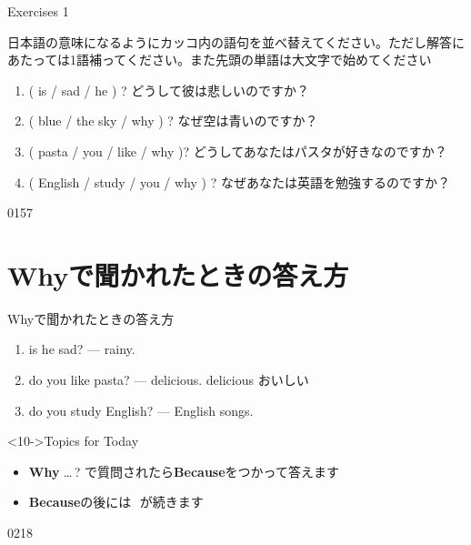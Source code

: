 \documentclass[aspectratio=169,xcolor={dvipsnames,table}]{beamer}
\begin{document}
\begin{frame}[plain]{Exercises 1}

{\small 日本語の意味になるようにカッコ内の語句を並べ替えてください。ただし解答にあたっては1語補ってください。また先頭の単語は大文字で始めてください}
 \begin{enumerate}
  \item ( is / sad / he ) ? どうして彼は悲しいのですか？\\
  \item ( blue / the sky / why ) ? なぜ空は青いのですか？\\
  \item ( pasta / you / like / why )? どうしてあなたはパスタが好きなのですか？\\
  \item ( English / study / you / why ) ? なぜあなたは英語を勉強するのですか？\\
 \end{enumerate}

\hfill{\tiny 0157}\,{\scriptsize {}}
\end{frame}
\section{Whyで聞かれたときの答え方}
\begin{frame}[plain]{Whyで聞かれたときの答え方}
 \begin{enumerate}
  \item<1->  is he sad? ---   rainy.
  \item<4->  do you like pasta? ---   delicious.%
\hfill{\scriptsize delicious  おいしい}
  \item<7->  do you study English? ---   English songs.
 \end{enumerate}

\bigskip

\begin{block}<10->{Topics for Today}
\pause
\begin{itemize}[square]\small
 \item {\bfseries Why} \ldots\,?\,\,で質問されたら{\bfseries Because}をつかって答えます\hfill{\small {}}
 \item {\bfseries Because}の後には\,\,\,\,が続きます
\end{itemize}
     \end{block}

\hfill{\tiny 0218}\,{\scriptsize {}}
\end{frame}
\end{document}
